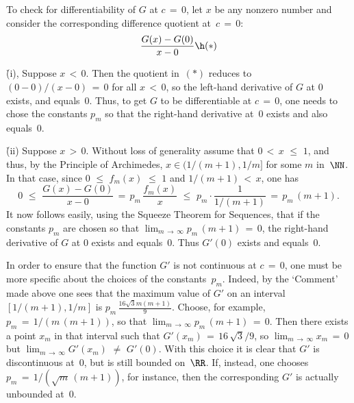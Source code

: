 {    To check for differentiability of $G$ at $c \,=\, 0$, let $x$ be any nonzero number and consider the corresponding difference quotient at~$c \,=\, 0$:
        \begin{displaymath}
        \frac{G(x)-G(0)}{x-0} \h ({\ast})
        \end{displaymath}


    \h (i), Suppose $x\,<\,0$. Then the quotient in~$({\ast})$ reduces to $(0-0)/(x-0) \,=\, 0$ for all $x\,<\,0$,
    so the left-hand derivative of $G$ at $0$ exists, and equals~$0$. Thus, to get $G$ to be differentiable at $c \,=\, 0$,
    one needs to chose the constants $p_{m}$ so that the right-hand derivative at~$0$ exists and also equals~$0$.

        \h (ii) Suppose $x\,>\,0$. Without loss of generality assume that $0\,<\,x\,\,{\leq}\,\,1$,
    and thus, by the Principle of Archimedes, $x{\in}(1/(m+1),1/m]$ for some $m$ in~${\NN}$.
    In that case, since $0\,\,{\leq}\,\,f_{m}(x)\,\,{\leq}\,\,1$ and $1/(m+1)\,<\,x$, one has
        \begin{displaymath}
        0\,\,{\leq}\,\,\frac{G(x)-G(0)}{x-0} \,=\, p_{m}\,\frac{f_{m}(x)}{x}\,\,{\leq}\,\, p_{m}{\cdot}\frac{1}{1/(m+1)} \,=\, p_{m}\,(m+1).
        \end{displaymath}
    It now follows easily, using the Squeeze Theorem for Sequences, that if the constants $p_{m}$
    are chosen so that $\lim_{m \,{\rightarrow}\, {\infty}} p_{m}\,(m+1) \,=\, 0$, the right-hand derivative of $G$ at $0$ exists and equals~$0$.
    Thus $G'(0)$ exists and equals~$0$.

        In order to ensure that the function $G'$ is not continuous at $c \,=\, 0$, one must be more specific about the choices of the constants~$p_{m}$.
    Indeed, by the `Comment' made above one sees that the maximum value of $G'$ on an interval $[1/(m+1),1/m]$ is
    ${\displaystyle p_{m}\,\frac{16\sqrt{3}m(m+1)}{9}}$. Choose, for example, $p_{m} \,=\, 1/(m\,(m+1))$,
    so that $\lim_{m \,{\rightarrow}\, {\infty}} p_{m}\,(m+1) \,=\, 0$. Then there exists a point $x_{m}$ in that interval such that $G'(x_{m}) \,=\, 16\,\sqrt{3}/9$,
    so $\lim_{m \,{\rightarrow}\, {\infty}} x_{m} \,=\, 0$ but $\lim_{m \,{\rightarrow}\, {\infty}} G'(x_{m}) \,\,{\neq}\,\, G'(0)$.
    With this choice it is clear that $G'$ is discontinuous at~$0$, but is still bounded on~${\RR}$.
    If, instead, one chooses $p_{m} \,=\, 1/(\sqrt{m}\,(m+1))$, for instance, then the corresponding $G'$ is actually unbounded at~$0$.
}%


